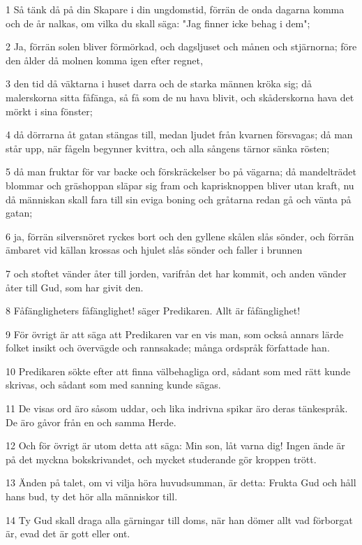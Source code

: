 \par 1 Så tänk då på din Skapare i din ungdomstid, förrän de onda dagarna komma och de år nalkas, om vilka du skall säga: "Jag finner icke behag i dem";
\par 2 Ja, förrän solen bliver förmörkad, och dagsljuset och månen och stjärnorna; före den ålder då molnen komma igen efter regnet,
\par 3 den tid då väktarna i huset darra och de starka männen kröka sig; då malerskorna sitta fåfänga, så få som de nu hava blivit, och skåderskorna hava det mörkt i sina fönster;
\par 4 då dörrarna åt gatan stängas till, medan ljudet från kvarnen försvagas; då man står upp, när fågeln begynner kvittra, och alla sångens tärnor sänka rösten;
\par 5 då man fruktar för var backe och förskräckelser bo på vägarna; då mandelträdet blommar och gräshoppan släpar sig fram och kaprisknoppen bliver utan kraft, nu då människan skall fara till sin eviga boning och gråtarna redan gå och vänta på gatan;
\par 6 ja, förrän silversnöret ryckes bort och den gyllene skålen slås sönder, och förrän ämbaret vid källan krossas och hjulet slås sönder och faller i brunnen
\par 7 och stoftet vänder åter till jorden, varifrån det har kommit, och anden vänder åter till Gud, som har givit den.
\par 8 Fåfängligheters fåfänglighet! säger Predikaren. Allt är fåfänglighet!
\par 9 För övrigt är att säga att Predikaren var en vis man, som också annars lärde folket insikt och övervägde och rannsakade; många ordspråk författade han.
\par 10 Predikaren sökte efter att finna välbehagliga ord, sådant som med rätt kunde skrivas, och sådant som med sanning kunde sägas.
\par 11 De visas ord äro såsom uddar, och lika indrivna spikar äro deras tänkespråk. De äro gåvor från en och samma Herde.
\par 12 Och för övrigt är utom detta att säga: Min son, låt varna dig! Ingen ände är på det myckna bokskrivandet, och mycket studerande gör kroppen trött.
\par 13 Änden på talet, om vi vilja höra huvudsumman, är detta: Frukta Gud och håll hans bud, ty det hör alla människor till.
\par 14 Ty Gud skall draga alla gärningar till doms, när han dömer allt vad förborgat är, evad det är gott eller ont.


